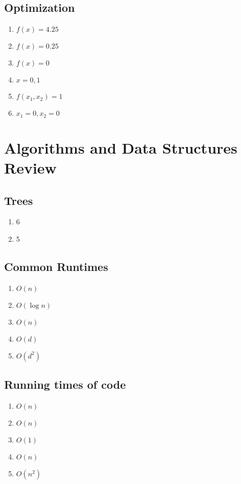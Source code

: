 \documentclass[letterpaper,12pt]{article}
\begin{document}
    \subsection{Optimization}
    \begin{enumerate}
        \item $f(x) = 4.25$
        \item $f(x) = 0.25$
        \item $f(x) = 0$
        \item $x = 0, 1$
        \item $f(x_1, x_2) = 1$
        \item $x_1 = 0, x_2 = 0$
    \end{enumerate}

    \section{Algorithms and Data Structures Review}
    \subsection{Trees}
    \begin{enumerate}
        \item 6
        \item 5
    \end{enumerate}

    \subsection{Common Runtimes}
    \begin{enumerate}
        \item $O(n)$
        \item $O(\log n)$
        \item $O(n)$
        \item $O(d)$
        \item $O(d^2)$
    \end{enumerate}

    \subsection{Running times of code}
    \begin{enumerate} 
        \item $O(n)$
        \item $O(n)$
        \item $O(1)$
        \item $O(n)$
        \item $O(n^2)$
    \end{enumerate}
\end{document}
